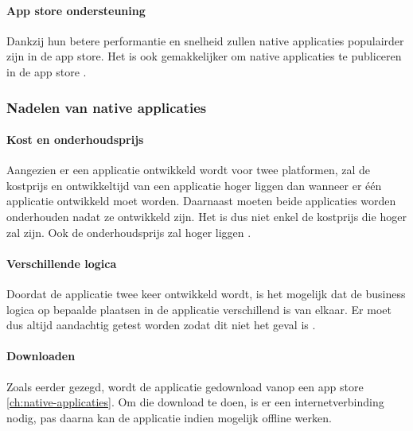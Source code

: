 \paragraph{App store ondersteuning}
Dankzij hun betere performantie en snelheid zullen native applicaties populairder zijn in de app store. 
Het is ook gemakkelijker om native applicaties te publiceren in de app store \autocite{Koffer2023}.

\subsubsection{Nadelen van native applicaties}
\paragraph{Kost en onderhoudsprijs}
Aangezien er een applicatie ontwikkeld wordt voor twee platformen, zal de kostprijs en 
ontwikkeltijd van een applicatie hoger liggen dan wanneer er één applicatie ontwikkeld moet 
worden. Daarnaast moeten beide applicaties worden onderhouden nadat ze 
ontwikkeld zijn. Het is dus niet enkel de kostprijs die hoger zal zijn. Ook de onderhoudsprijs zal 
hoger liggen \autocite{AWS2023}. 

\paragraph{Verschillende logica}
Doordat de applicatie twee keer ontwikkeld wordt, is het mogelijk dat de business 
logica op bepaalde plaatsen in de applicatie verschillend is van elkaar. 
Er moet dus altijd aandachtig getest worden zodat dit niet het geval is \autocite{Kotlin2023}.

\paragraph{Downloaden}
Zoals eerder gezegd, wordt de applicatie gedownload vanop een app store \ref{ch:native-applicaties}. 
Om die download te doen, is er een internetverbinding nodig, 
pas daarna kan de applicatie indien mogelijk offline werken.

